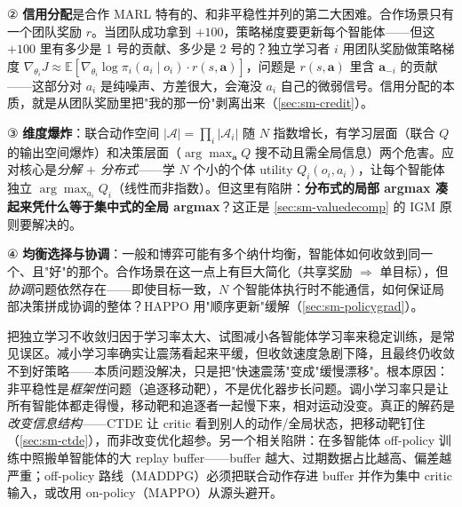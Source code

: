② \textbf{信用分配}是合作 MARL 特有的、和非平稳性并列的第二大困难。合作场景只有一个团队奖励 $r$。当团队成功拿到 $+100$，策略梯度要更新每个智能体——但这 $+100$ 里有多少是 1 号的贡献、多少是 2 号的？独立学习者 $i$ 用团队奖励做策略梯度 $\nabla_{\theta_i}J\approx\mathbb{E}[\nabla_{\theta_i}\log\pi_i(a_i\mid o_i)\cdot r(s,\mathbf{a})]$，问题是 $r(s,\mathbf{a})$ 里含 $\mathbf{a}_{-i}$ 的贡献——这部分对 $a_i$ 是纯噪声、方差很大，会淹没 $a_i$ 自己的微弱信号。信用分配的本质，就是从团队奖励里把"我的那一份"剥离出来（\cref{sec:sm-credit}）。

③ \textbf{维度爆炸}：联合动作空间 $|\boldsymbol{\mathcal{A}}|=\prod_i|\mathcal{A}_i|$ 随 $N$ 指数增长，有学习层面（联合 $Q$ 的输出空间爆炸）和决策层面（$\arg\max_{\mathbf{a}}Q$ 搜不动且需全局信息）两个危害。应对核心是\emph{分解 $+$ 分布式}——学 $N$ 个小的个体 utility $Q_i(o_i,a_i)$，让每个智能体独立 $\arg\max_{a_i}Q_i$（线性而非指数）。但这里有陷阱：\textbf{分布式的局部 argmax 凑起来凭什么等于集中式的全局 argmax}？这正是 \cref{sec:sm-valuedecomp} 的 IGM 原则要解决的。

④ \textbf{均衡选择与协调}：一般和博弈可能有多个纳什均衡，智能体如何收敛到同一个、且"好"的那个。合作场景在这一点上有巨大简化（共享奖励 $\Rightarrow$ 单目标），但\emph{协调}问题依然存在——即使目标一致，$N$ 个智能体执行时不能通信，如何保证局部决策拼成协调的整体？HAPPO 用"顺序更新"缓解（\cref{sec:sm-policygrad}）。

\begin{pitfall}
把独立学习不收敛归因于学习率太大、试图减小各智能体学习率来稳定训练，是常见误区。减小学习率确实让震荡看起来平缓，但收敛速度急剧下降，且最终仍收敛不到好策略——本质问题没解决，只是把"快速震荡"变成"缓慢漂移"。根本原因：非平稳性是\emph{框架性}问题（追逐移动靶），不是优化器步长问题。调小学习率只是让所有智能体都走得慢，移动靶和追逐者一起慢下来，相对运动没变。真正的解药是\emph{改变信息结构}——CTDE 让 critic 看到别人的动作/全局状态，把移动靶钉住（\cref{sec:sm-ctde}），而非改变优化超参。另一个相关陷阱：在多智能体 off-policy 训练中照搬单智能体的大 replay buffer——buffer 越大、过期数据占比越高、偏差越严重；off-policy 路线（MADDPG）必须把联合动作存进 buffer 并作为集中 critic 输入，或改用 on-policy（MAPPO）从源头避开。
\end{pitfall}

